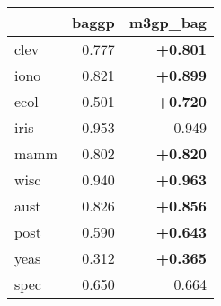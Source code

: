 \begin{tabular}{lrr}
\toprule
{} &  baggp &  m3gp\_bag \\
\midrule
clev & 0.777 & \textbf{+0.801} \\
iono & 0.821 & \textbf{+0.899} \\
ecol & 0.501 & \textbf{+0.720} \\
iris & 0.953 & 0.949 \\
mamm & 0.802 & \textbf{+0.820} \\
wisc & 0.940 & \textbf{+0.963} \\
aust & 0.826 & \textbf{+0.856} \\
post & 0.590 & \textbf{+0.643} \\
yeas & 0.312 & \textbf{+0.365} \\
spec & 0.650 & 0.664 \\
\bottomrule
\end{tabular}
